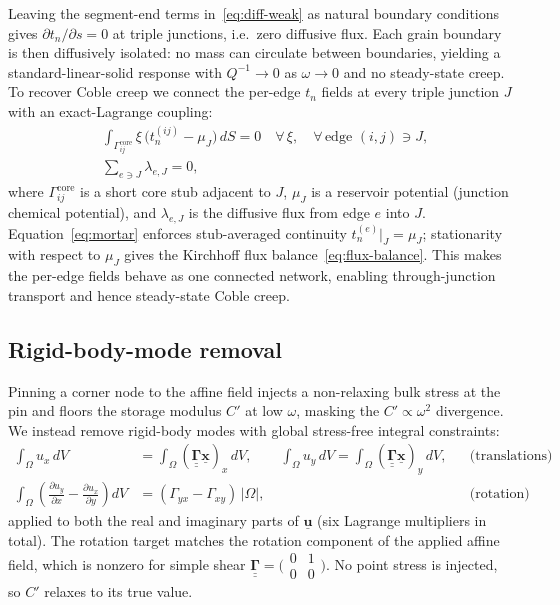 \documentclass[12pt]{article}
\newcommand{\pd}[2]{\frac{\partial{#1}}{\partial{#2}}}
\newcommand{\tensor}[1]{\underline{\underline{\boldsymbol{#1}}}}
\newcommand{\vect}[1]{\underline{\boldsymbol{#1}}}
\begin{document}
Leaving the segment-end terms in~\eqref{eq:diff-weak} as natural boundary conditions gives $\partial t_n/\partial s = 0$ at triple junctions, i.e.\ zero diffusive flux. Each grain boundary is then diffusively isolated: no mass can circulate between boundaries, yielding a standard-linear-solid response with $Q^{-1} \to 0$ as $\omega \to 0$ and no steady-state creep. To recover Coble creep we connect the per-edge $t_n$ fields at every triple junction $J$ with an exact-Lagrange coupling:
\begin{subequations}
\label{eq:junction}
\begin{align}
    &\int_{\Gamma_{ij}^{\mathrm{core}}} \xi\,\bigl(t_n^{(ij)} - \mu_J\bigr)\, dS = 0
      \quad \forall\,\xi,\quad \forall\,\text{edge }(i,j) \ni J, \label{eq:mortar} \\
    &\sum_{e \ni J} \lambda_{e,J} = 0, \label{eq:flux-balance}
\end{align}
\end{subequations}
where $\Gamma_{ij}^{\mathrm{core}}$ is a short core stub adjacent to $J$, $\mu_J$ is a reservoir potential (junction chemical potential), and $\lambda_{e,J}$ is the diffusive flux from edge $e$ into $J$. Equation~\eqref{eq:mortar} enforces stub-averaged continuity $t_n^{(e)}|_J = \mu_J$; stationarity with respect to $\mu_J$ gives the Kirchhoff flux balance~\eqref{eq:flux-balance}. This makes the per-edge fields behave as one connected network, enabling through-junction transport and hence steady-state Coble creep.

\subsection{Rigid-body-mode removal}

Pinning a corner node to the affine field injects a non-relaxing bulk stress at the pin and floors the storage modulus $C'$ at low $\omega$, masking the $C' \propto \omega^2$ divergence. We instead remove rigid-body modes with global stress-free integral constraints:
\begin{subequations}
\label{eq:rbm}
\begin{align}
    \int_\Omega u_x\, dV &= \int_\Omega (\tensor{\Gamma}\vect{x})_x\, dV, \qquad
    \int_\Omega u_y\, dV = \int_\Omega (\tensor{\Gamma}\vect{x})_y\, dV,
    & &\text{(translations)} \\
    \int_\Omega \left(\pd{u_y}{x} - \pd{u_x}{y}\right) dV
    &= (\Gamma_{yx} - \Gamma_{xy})\,|\Omega|,
    & &\text{(rotation)}
\end{align}
\end{subequations}
applied to both the real and imaginary parts of $\vect{u}$ (six Lagrange multipliers in total). The rotation target matches the rotation component of the applied affine field, which is nonzero for simple shear $\tensor{\Gamma} = \bigl(\begin{smallmatrix}0&1\\0&0\end{smallmatrix}\bigr)$. No point stress is injected, so $C'$ relaxes to its true value.
\end{document}
